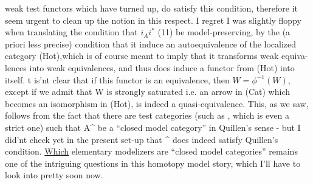weak test functors which have turned up,  do satisfy this condition,  
therefore it  seem urgent to clean up the notion in this respect.
I regret I was slightly floppy when translating the condition  that
\inserted{$\phi =$} $i_A i^*$  (11)  be model-preserving,  by the (a priori less precise)
condition that it induce an autoequivalence of the localized category
(Hot),\hand{(}which is of course meant to imply that it transforms weak equiva-%
lences into weak equivalences,  and thus does induce a functor from (Hot)
into itself\hand{)}.  t is'nt clear that if this functor is an equivalence,
then  $W = \phi^{-1}(W)$,  except if we admit that W is strongly saturated  i.e.
an arrow in (Cat) which becomes an isomorphism in (Hot),  is indeed a
quasi-equivalence.  This, as we saw,  follows from the fact that there
are  test categories (such as \hand{$\Delta$} , which is even a strict one)\hand{,} such that
A\^{}  be a ``closed model category'' in Quillen's sense  -  but I did'nt check
yet in the present set-up that \hand{$\Delta$}\^{} does indeed satisfy Quillen's condition.
\uline{Which} elementary modelizers are ``closed model categories'' remains one of
the intriguing questions in this homotopy model story,  which I'll have to
look into pretty soon now.


